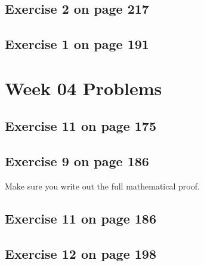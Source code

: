 \documentclass[12pt]{amsart}
\begin{document}
\subsection{Exercise 2 on page 217}
\subsection{ Exercise 1 on page 191} 


\section{Week 04 Problems}
\subsection{Exercise 11 on page 175} 
\subsection{Exercise 9 on page 186} Make sure you write out the full mathematical proof.
\subsection{Exercise 11 on page 186}
\subsection{Exercise 12 on page 198}
\end{document}
